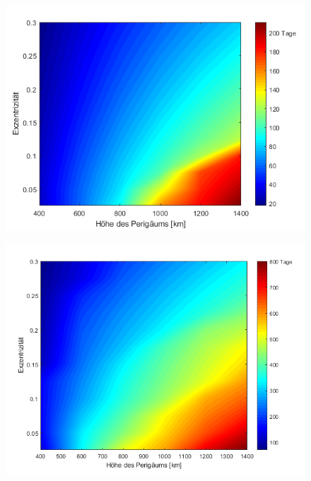 \begin{figure}[h!]
	\centering
		\includegraphics[width=1.00\textwidth]{./graphics/GMAT/ecc_perigee_50kg.png}
	\label{fig:GMAT_ecc_50}
\end{figure}

\begin{figure}[h!]
	\centering
		\includegraphics[width=1.00\textwidth]{./graphics/GMAT/ecc_perigee_375kg.png}
	\label{fig:GMAT_ecc_375}
\end{figure}

